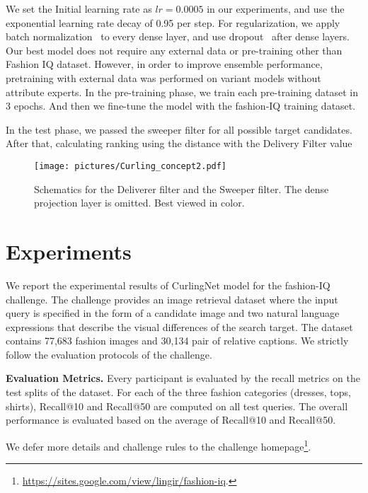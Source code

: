 \documentclass[10pt,twocolumn,letterpaper]{article}
\begin{document}
We set the Initial learning rate as $lr = 0.0005$ in our experiments, and use the exponential learning rate decay of 0.95 per step.
For regularization, we apply batch normalization~\cite{Sergey-icml-2015} to every dense layer, and use dropout~\cite{srivastava-jmlr-2014} after dense layers.
Our best model does not require any external data or pre-training other than Fashion IQ dataset. However, in order to improve ensemble performance, pretraining with external data was performed on variant models without attribute experts.
In the pre-training phase, we train each pre-training dataset in 3 epochs. And then we fine-tune the model with the fashion-IQ training dataset.  

In the test phase, we passed the sweeper filter for all possible target candidates. After that, calculating ranking using the distance with the Delivery Filter value

\begin{figure}[t]
\centering
\texttt{[image: pictures/Curling\_concept2.pdf]}
\caption{
Schematics for the Deliverer filter and the Sweeper filter. The dense projection layer is omitted. Best viewed in color.
}
\label{fig:filter_detail}
\end{figure}




\section{Experiments}
\label{sec:experiments}

We report the experimental results of CurlingNet model for the fashion-IQ challenge.
The challenge provides an image retrieval dataset where the input query is specified in the form of a candidate image and two natural language expressions that describe the visual differences of the search target.
The dataset contains 77,683 fashion images and 30,134 pair of relative captions.
We strictly follow the evaluation protocols of the challenge.

\textbf{Evaluation Metrics.}
Every participant is evaluated by the recall metrics on the test splits of the dataset. 
For each of the three fashion categories (dresses, tops, shirts), Recall@10 and Recall@50 are computed on all test queries.
The overall performance is evaluated based on the average of Recall@10 and Recall@50. 

We defer more details and challenge rules to the challenge homepage\footnote{\url{https://sites.google.com/view/lingir/fashion-iq}.}.
\end{document}
